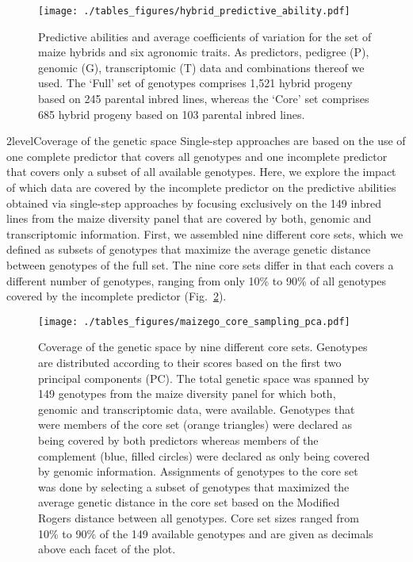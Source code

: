 \documentclass[12pt,titlepage]{article}
\begin{document}
\begin{figure}[H]
\centering
  \texttt{[image: ./tables\_figures/hybrid\_predictive\_ability.pdf]}
  \caption{
    Predictive abilities and average coefficients of variation for the set of 
    maize hybrids and six agronomic traits.
    As predictors, pedigree (P), genomic (G), transcriptomic (T) data and 
    combinations thereof we used.
    The `Full' set of genotypes comprises 1,521 hybrid progeny based on 245
    parental inbred lines, whereas the `Core' set comprises 685 hybrid progeny
    based on 103 parental inbred lines.
  }
\label{fig:HybridResults}
\end{figure}





\Genetics2level{Coverage of the genetic space}
Single-step approaches are based on the use of one complete predictor that
covers all genotypes and one incomplete predictor that covers only a subset of
all available genotypes.
Here, we explore the impact of which data are covered by the incomplete 
predictor on the predictive abilities obtained via single-step approaches by
focusing exclusively on the 149 inbred lines from the maize diversity panel
that are covered by both, genomic and transcriptomic information.
First, we assembled nine different core sets, which we defined as subsets
of genotypes that maximize the average genetic distance between genotypes of
the full set.
The nine core sets differ in that each covers a different number of genotypes,
ranging from only 10\% to 90\% of all genotypes covered by the incomplete
predictor (Fig.~\ref{fig:CoreSetPCA}).



\begin{figure}[H]
\centering
\texttt{[image: ./tables\_figures/maizego\_core\_sampling\_pca.pdf]}
\caption{
  Coverage of the genetic space by nine different core sets. 
  Genotypes are distributed according to their scores based on the first two
  principal components (PC).
  The total genetic space was spanned by 149 genotypes from the maize diversity 
  panel for which both, genomic and transcriptomic data, were available.
  Genotypes that were members of the core set (orange triangles) were declared 
  as being covered by both predictors whereas members of the complement (blue,
  filled circles) were declared as only being covered by genomic information.
  Assignments of genotypes to the core set was done by selecting a subset of
  genotypes that maximized the average genetic distance in the core set based 
  on the Modified Rogers distance between all genotypes.
  Core set sizes ranged from 10\% to 90\% of the 149 available genotypes and
  are given as decimals above each facet of the plot.
}
\label{fig:CoreSetPCA}
\end{figure}
\end{document}
